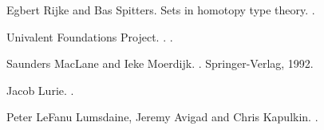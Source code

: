 \documentclass[conference]{IEEEtran}
\begin{document}
%
%
%
\begin{thebibliography}{4}

Egbert Rijke and Bas Spitters.
\newblock Sets in homotopy type theory.
.

{Univalent Foundations Project}.
.
.

Saunders MacLane and Ieke Moerdijk.
.
\newblock Springer-Verlag, 1992.

Jacob Lurie.
.

Peter LeFanu Lumsdaine, Jeremy Avigad and Chris Kapulkin.
.

\end{thebibliography}




\end{document}
